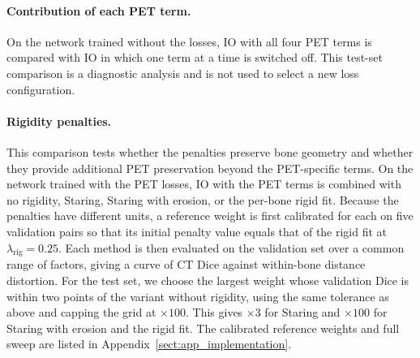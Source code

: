 \paragraph{Contribution of each PET term.}
On the network trained without the losses, IO with all four PET terms is compared with IO in which one term at a time is switched off.
This test-set comparison is a diagnostic analysis and is not used to select a new loss configuration.

\paragraph{Rigidity penalties.}
This comparison tests whether the penalties preserve bone geometry and whether they provide additional PET preservation beyond the PET-specific terms.
On the network trained with the PET losses, IO with the PET terms is combined with no rigidity, Staring, Staring with erosion, or the per-bone rigid fit.
Because the penalties have different units, a reference weight is first calibrated for each on five validation pairs so that its initial penalty value equals that of the rigid fit at $\lambda_{\mathrm{rig}}=0.25$.
Each method is then evaluated on the validation set over a common range of factors, giving a curve of CT Dice against within-bone distance distortion.
For the test set, we choose the largest weight whose validation Dice is within two points of the variant without rigidity, using the same tolerance as above and capping the grid at $\times100$.
This gives $\times3$ for Staring and $\times100$ for Staring with erosion and the rigid fit.
The calibrated reference weights and full sweep are listed in Appendix~\ref{sect:app_implementation}.
